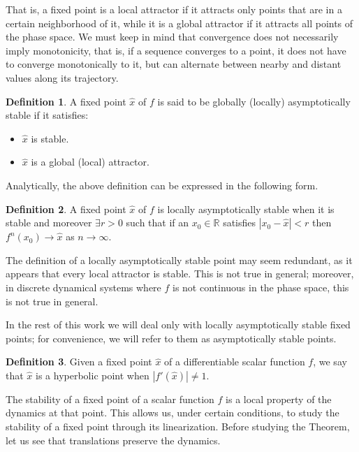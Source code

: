 \documentclass[12pt,a4paper]{report}
\theoremstyle{definition}
\newtheorem{definicion}{Definition}[section]
\begin{document}
That is, a fixed point is a local attractor if it attracts only points that are in a certain neighborhood of it, while it is a global attractor if it attracts all points of the phase space. We must keep in mind that convergence does not necessarily imply monotonicity, that is, if a sequence converges to a point, it does not have to converge monotonically to it, but can alternate between nearby and distant values along its trajectory.

\begin{definicion}

A fixed point $\hat{x}$ of $f$ is said to be globally (locally) asymptotically stable if it satisfies:
\begin{itemize}
    \item $\hat{x}$ is stable.
    \item $\hat{x}$ is a global (local) attractor.
\end{itemize}

\end{definicion}

Analytically, the above definition can be expressed in the following form.

\begin{definicion}

A fixed point $\hat{x} $ of  $f$ is locally asymptotically stable when it is stable and moreover $\exists r > 0$ such that if an $x_0 \in \mathbb{R}$ satisfies $|x_0 - \hat{x}| < r$ then $f^n(x_0) \rightarrow \hat{x}$ as $n \rightarrow \infty$.

\end{definicion}

The definition of a locally asymptotically stable point may seem redundant, as it appears that every local attractor is stable. This is not true in general; moreover, in discrete dynamical systems where \(f\) is not continuous in the phase space, this is not true in general.

In the rest of this work we will deal only with locally asymptotically stable fixed points; for convenience, we will refer to them as asymptotically stable points.

\begin{definicion}

Given a fixed point $\hat{x} $ of a differentiable scalar function $f$, we say that $\hat{x}$ is a hyperbolic point when $|f'(\hat{x})| \neq 1$.
\end{definicion}

The stability of a fixed point of a scalar function $f$ is a local property of the dynamics at that point. This allows us, under certain conditions, to study the stability of a fixed point through its linearization. Before studying the Theorem, let us see that translations preserve the dynamics.
\end{document}
